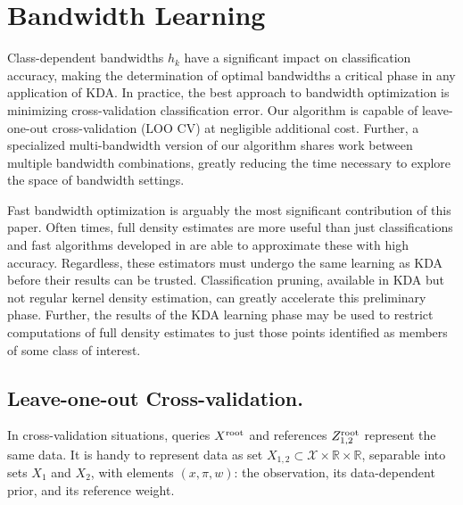 \documentclass[twoside,leqno,twocolumn]{article}
\newcommand{\kdroot}[1]{#1^{\rm root}}
\begin{document}
\section{Bandwidth Learning}\label{sec:bw}
Class-dependent bandwidths $h_k$ have a significant impact on
classification accuracy, making the determination of optimal
bandwidths a critical phase in any application of KDA.  In practice,
the best approach to bandwidth optimization is minimizing
cross-validation classification error.  Our algorithm is capable of
leave-one-out cross-validation (LOO CV) at negligible additional cost.
Further, a specialized multi-bandwidth version of our algorithm shares
work between multiple bandwidth combinations, greatly reducing the
time necessary to explore the space of bandwidth settings.

Fast bandwidth optimization is arguably the most significant
contribution of this paper.  Often times, full density estimates are
more useful than just classifications and fast algorithms developed in
\cite{nips2000paper, kde-siamdm, kde-nips-dong, kde-uai-dong} are able
to approximate these with high accuracy.  Regardless, these estimators
must undergo the same learning as KDA before their results can be
trusted.  Classification pruning, available in KDA but not regular
kernel density estimation, can greatly accelerate this preliminary
phase.  Further, the results of the KDA learning phase may be used to
restrict computations of full density estimates to just those points
identified as members of some class of interest.

\subsection{Leave-one-out Cross-validation.}
In cross-validation situations, queries $\kdroot{X}$ and references
$\kdroot{Z}_{1,2}$ represent the same data.  It is handy to represent
data as set $X_{1,2} \subset \mathcal{X} \times \mathbb{R} \times
\mathbb{R}$, separable into sets $X_1$ and $X_2$, with elements
$(x,\pi,w)$: the observation, its data-dependent prior, and its
reference weight.
\end{document}
